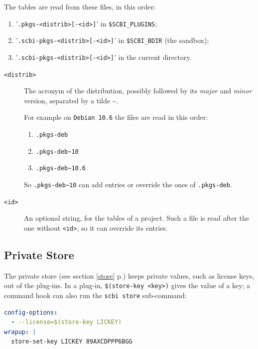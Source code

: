 \documentclass[a4paper,12pt,twoside]{article}
\newcommand{\code}[1]{\texttt{#1}}
\renewcommand{\emph}[1]{\textit{#1}}
\newcommand{\seeref}[1]{see section \ref{#1} p.\pageref{#1}}
\newcommand{\file}[1]{'{\texttt{#1}}'}
\begin{document}
The tables are read from these files, in this order:

\begin{enumerate}
	\item \file{.pkgs-<distrib>[-<id>]} in \code{\$SCBI\_PLUGINS};
	\item \file{.scbi-pkgs-<distrib>[-<id>]} in \code{\$SCBI\_BDIR} (the sandbox);
	\item \file{.scbi-pkgs-<distrib>[-<id>]} in the current directory.
\end{enumerate}

\begin{description}
	\item [\code{<distrib>}] The acronym of the distribution, possibly followed by its \emph{major} and \emph{minor} version, separated by a tilde \textasciitilde{}.

For example on \code{Debian 10.6} the files are read in this order:

\begin{enumerate}
	\item \code{.pkgs-deb}
	\item \code{.pkgs-deb\textasciitilde{}10}
	\item \code{.pkgs-deb\textasciitilde{}10.6}
\end{enumerate}

So \code{.pkgs-deb\textasciitilde{}10} can add entries or override the ones of \code{.pkgs-deb}.

\item [\code{<id>}] An optional string, for the tables of a project. Such a file is read after the one without \code{<id>}, so it can override its entries.
\end{description}

\subsection{Private Store}

The private store (\seeref{store}) keeps private values, such as license keys, out of the plug-ins. In a plug-in, \code{\$(store-key <key>)} gives the value of a key; a command hook can also run the \code{scbi store} sub-command:

\begin{lstlisting}[language={yaml}]
config-options:
  - --license=$(store-key LICKEY)
wrapup: |
  store-set-key LICKEY 89AXCDPPP6BGG
\end{lstlisting}
\end{document}
